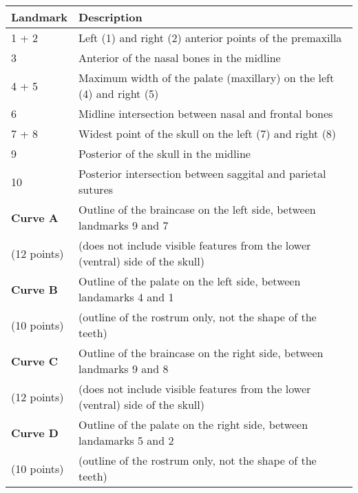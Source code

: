 
\begin{tabular}[t]{p{3cm}  l}		
\hline
\textbf{Landmark} & \textbf{Description} \\
\hline
1 + 2 & Left (1) and right (2) anterior points of the premaxilla \\
3 & Anterior of the nasal bones in the midline \\
4 + 5 &	Maximum width of the palate (maxillary) on the left (4) and right (5)\\
6 & Midline intersection between nasal and frontal bones \\
7 + 8 & Widest point of the skull on the left (7) and right (8) \\
9 &	Posterior of the skull in the midline \\
10 & Posterior intersection between saggital and parietal sutures \\
\hline
\textbf{Curve A} & Outline of the braincase on the left side, between landmarks 9 and 7\\ 
(12 points) & (does not include visible features from the lower (ventral) side of the skull) \\

\textbf{Curve B} & Outline of the palate on the left side, between landamarks 4 and 1 \\
(10 points) & (outline of the rostrum only, not the shape of the teeth)\\

\textbf{Curve C} &	Outline of the braincase on the right side, between landmarks 9 and 8 \\
(12 points) & (does not include visible features from the lower (ventral) side of the skull) \\

\textbf{Curve D} & Outline of the palate on the right side, between landamarks 5 and 2 \\
(10 points) & (outline of the rostrum only, not the shape of the teeth)\\
\hline
\end{tabular}